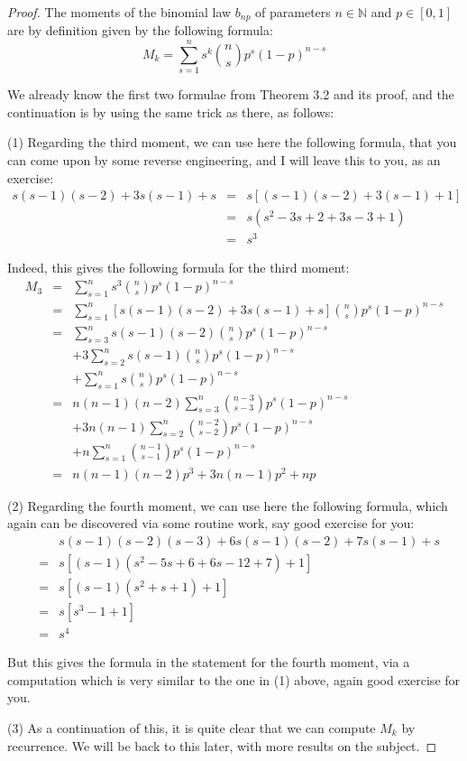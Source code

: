 \documentclass[12pt]{amsbook}
\begin{document}
\begin{proof}
The moments of the binomial law $b_{np}$ of parameters $n\in\mathbb N$ and $p\in[0,1]$ are by definition given by the following formula:
$$M_k=\sum_{s=1}^ns^k\binom{n}{s}p^s(1-p)^{n-s}$$

We already know the first two formulae from Theorem 3.2 and its proof, and the continuation is by using the same trick as there, as follows:

\medskip

(1) Regarding the third moment, we can use here the following formula, that you can come upon by some reverse engineering, and I will leave this to you, as an exercise:
\begin{eqnarray*}
s(s-1)(s-2)+3s(s-1)+s
&=&s[(s-1)(s-2)+3(s-1)+1]\\
&=&s(s^2-3s+2+3s-3+1)\\
&=&s^3
\end{eqnarray*}

Indeed, this gives the following formula for the third moment:
\begin{eqnarray*}
M_3
&=&\sum_{s=1}^ns^3\binom{n}{s}p^s(1-p)^{n-s}\\
&=&\sum_{s=1}^n\left[s(s-1)(s-2)+3s(s-1)+s\right]\binom{n}{s}p^s(1-p)^{n-s}\\
&=&\sum_{s=3}^ns(s-1)(s-2)\binom{n}{s}p^s(1-p)^{n-s}\\
&&+3\sum_{s=2}^ns(s-1)\binom{n}{s}p^s(1-p)^{n-s}\\
&&+\sum_{s=1}^ns\binom{n}{s}p^s(1-p)^{n-s}\\
&=&n(n-1)(n-2)\sum_{s=3}^n\binom{n-3}{s-3}p^s(1-p)^{n-s}\\
&&+3n(n-1)\sum_{s=2}^n\binom{n-2}{s-2}p^s(1-p)^{n-s}\\
&&+n\sum_{s=1}^n\binom{n-1}{s-1}p^s(1-p)^{n-s}\\
&=&n(n-1)(n-2)p^3+3n(n-1)p^2+np
\end{eqnarray*}

(2) Regarding the fourth moment, we can use here the following formula, which again can be discovered via some routine work, say good exercise for you:
\begin{eqnarray*}
&&s(s-1)(s-2)(s-3)+6s(s-1)(s-2)+7s(s-1)+s\\
&=&s[(s-1)(s^2-5s+6+6s-12+7)+1]\\
&=&s[(s-1)(s^2+s+1)+1]\\
&=&s[s^3-1+1]\\
&=&s^4
\end{eqnarray*}

But this gives the formula in the statement for the fourth moment, via a computation which is very similar to the one in (1) above, again good exercise for you.

\medskip

(3) As a continuation of this, it is quite clear that we can compute $M_k$ by recurrence. We will be back to this later, with more results on the subject.
\end{proof}
\end{document}
